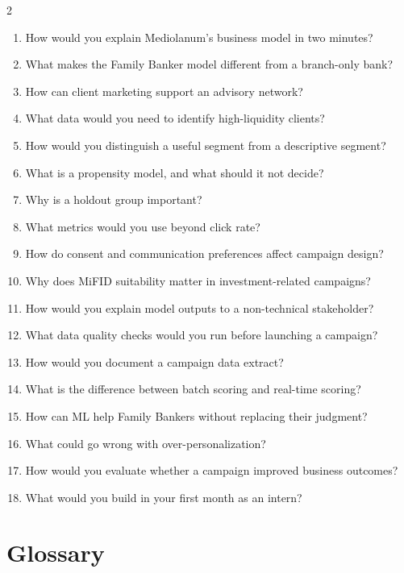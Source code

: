 \documentclass[
	11pt,
	fleqn,
	a4paper,
	oneside,
]{LegrandOrangeBook}
\begin{document}
\begin{multicols}{2}
\begin{enumerate}
	\item How would you explain Mediolanum's business model in two minutes?
	\item What makes the Family Banker model different from a branch-only bank?
	\item How can client marketing support an advisory network?
	\item What data would you need to identify high-liquidity clients?
	\item How would you distinguish a useful segment from a descriptive segment?
	\item What is a propensity model, and what should it not decide?
	\item Why is a holdout group important?
	\item What metrics would you use beyond click rate?
	\item How do consent and communication preferences affect campaign design?
	\item Why does MiFID suitability matter in investment-related campaigns?
	\item How would you explain model outputs to a non-technical stakeholder?
	\item What data quality checks would you run before launching a campaign?
	\item How would you document a campaign data extract?
	\item What is the difference between batch scoring and real-time scoring?
	\item How can ML help Family Bankers without replacing their judgment?
	\item What could go wrong with over-personalization?
	\item How would you evaluate whether a campaign improved business outcomes?
	\item What would you build in your first month as an intern?
\end{enumerate}
\end{multicols}

\section{Glossary}
\end{document}
